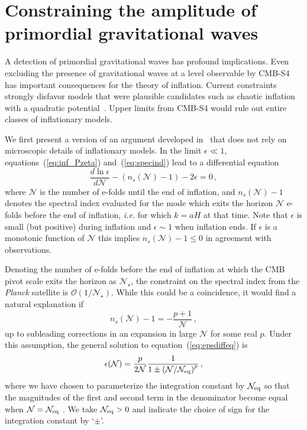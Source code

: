 \section{Constraining the amplitude of primordial gravitational waves} 
\label{sec:upperLimits}
A detection of primordial gravitational waves has profound implications. Even excluding the presence of gravitational waves at a level observable by CMB-S4 has important consequences for the theory of inflation. Current constraints strongly disfavor models that were plausible candidates such as chaotic inflation with a quadratic potential~\cite{bicepkeckplanck15}. Upper limits from CMB-S4 would rule out entire classes of inflationary models. 

We first present a version of an argument developed in~\cite{Mukhanov:2013tua,Roest:2013fha,Creminelli:2014nqa} that does not rely on microscopic details of inflationary models. In the limit $\epsilon\ll1$, equations~(\ref{eq:inf_Pzeta}) and~(\ref{eq:specind}) lead to a differential equation
\begin{equation}\label{eq:epsdiffeq}
\frac{d\ln\epsilon}{d\mathcal{N}}-(n_s(\mathcal{N})-1)-2\epsilon=0\,,
\end{equation} 
where $\mathcal{N}$ is the number of e-folds until the end of inflation, and $n_s(\mathcal{N})-1$ denotes the spectral index evaluated for the mode which exits the horizon $\mathcal{N}$ e-folds before the end of inflation, {\it i.e.} for which $k=aH$ at that time. Note that $\epsilon$ is small (but positive) during inflation and $\epsilon\sim 1$ when inflation ends. If $\epsilon$ is a monotonic function of $\mathcal{N}$ this implies $n_s(\mathcal{N})-1\leq 0$ in agreement with observations. 

Denoting the number of e-folds before the end of inflation at which the CMB pivot scale exits the horizon as $\mathcal{N}_\star$, the constraint on the spectral index from the {\it Planck} satellite is $\mathcal{O}(1/\mathcal{N}_\star)$. While this could be a coincidence, it would find a natural explanation if 
\begin{equation}\label{eq:nsassump}
n_s(\mathcal{N})-1=-\frac{p+1}{\mathcal{N}}\,,
\end{equation}
up to subleading corrections in an expansion in large $\mathcal{N}$ for some real $p$. Under this assumption, the general solution to equation~(\ref{eq:epsdiffeq}) is
\begin{equation}\label{eq:epssol}
\epsilon(\mathcal{N})=\frac{p}{2\mathcal{N}}\frac{1}{1\pm\left(\mathcal{N}/\mathcal{N}_{\rm eq}\right)^{p}}\,,
\end{equation}
where we have chosen to parameterize the integration constant by $\mathcal{N}_{\rm eq}$ so that the magnitudes of the first and second term in the denominator become equal when $\mathcal{N}=\mathcal{N}_{\rm eq}$ . We take $\mathcal{N}_{\rm eq}>0$ and indicate the choice of sign for the integration constant by `$\pm$'. 

